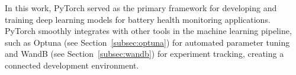 In this work, PyTorch served as the primary framework for developing and training deep learning models for battery health monitoring applications. PyTorch smoothly integrates with other tools in the machine learning pipeline, such as Optuna (see Section~\ref{subsec:optuna}) for automated parameter tuning and WandB (see Section~\ref{subsec:wandb}) for experiment tracking, creating a connected development environment.



